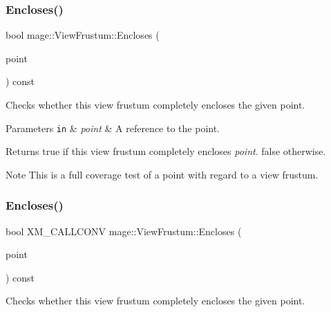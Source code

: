\subsubsection{\texorpdfstring{Encloses()}{Encloses()}\hspace{0.1cm}{\footnotesize\ttfamily [1/4]}}
{\footnotesize\ttfamily bool mage\+::\+View\+Frustum\+::\+Encloses (\begin{DoxyParamCaption}\item[{const \hyperlink{structmage_1_1_point3}{Point3} \&}]{point }\end{DoxyParamCaption}) const\hspace{0.3cm}{\ttfamily [noexcept]}}

Checks whether this view frustum completely encloses the given point.


\begin{DoxyParams}[1]{Parameters}
\mbox{\tt in}  & {\em point} & A reference to the point. \\
\hline
\end{DoxyParams}
\begin{DoxyReturn}{Returns}
{\ttfamily true} if this view frustum completely encloses {\itshape point}. {\ttfamily false} otherwise. 
\end{DoxyReturn}
\begin{DoxyNote}{Note}
This is a full coverage test of a point with regard to a view frustum. 
\end{DoxyNote}
\hypertarget{structmage_1_1_view_frustum_a94ad03cd84953b11722c5c3367e4b810}{}\label{structmage_1_1_view_frustum_a94ad03cd84953b11722c5c3367e4b810} 
\subsubsection{\texorpdfstring{Encloses()}{Encloses()}\hspace{0.1cm}{\footnotesize\ttfamily [2/4]}}
{\footnotesize\ttfamily bool X\+M\+\_\+\+C\+A\+L\+L\+C\+O\+NV mage\+::\+View\+Frustum\+::\+Encloses (\begin{DoxyParamCaption}\item[{F\+X\+M\+V\+E\+C\+T\+OR}]{point }\end{DoxyParamCaption}) const\hspace{0.3cm}{\ttfamily [noexcept]}}

Checks whether this view frustum completely encloses the given point.


